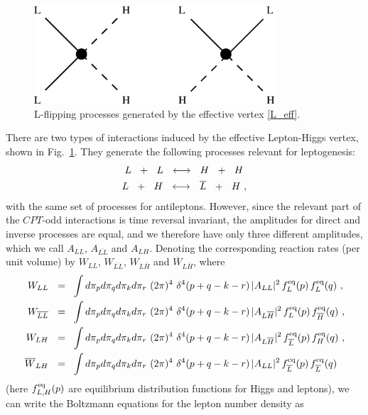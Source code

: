 \documentclass[12pt]{revtex4}
\newcommand{\eq}{{\rm eq}}
\newcommand{\ov}{\overline}
\begin{document}
\begin{figure}
\includegraphics[width=9cm]{lflip.eps}
\caption{L-flipping processes generated by the effective vertex \eqref{L_eff}.}
\label{lflip_fig}
\end{figure}
There are two types of interactions induced by the effective
Lepton-Higgs vertex, 
shown in  Fig.~\ref{lflip_fig}.
They generate the following processes relevant for leptogenesis:
\begin{align}
\notag
	L~~+~~L ~~\longleftrightarrow~~ H~~+~~H~  \\
\notag
	L~~+~~H ~~\longleftrightarrow~~ \ov{L}~~+~~H~,
\end{align}
with the same set of processes
for antileptons.
However, since the relevant part of the $CPT$-odd interactions is time reversal invariant, 
the amplitudes for
direct and inverse processes are equal, and we therefore have 
only three different amplitudes, which we call  
$ A_{LL} $, $ A_{\ov{LL}} $ and $ A_{LH} $.
Denoting the corresponding reaction rates (per unit volume) by
$ W_{LL} $, $ W_{\ov{LL}} $, $ W_{L\ov{H}} $ and $ \ov{W}_{L\ov{H}} $,
where 
\begin{align*}
	W_{LL}   ~~=~~  &
		\int d\pi_p d\pi_q d\pi_k d\pi_r ~
		(2\pi)^4~ \delta^4 ( p + q - k - r )\,
		| A_{LL} |^2\, f_L^\eq(p)\, f_L^\eq(q)~, \\
	W_{\ov{LL}}   ~~=~~  &
		\int d\pi_p d\pi_q d\pi_k d\pi_r ~
		(2\pi)^4~ \delta^4 ( p + q - k - r )\,
		| A_{L\ov{H}} |^2\, f_L^\eq(p)\, f_{\ov{H}}^\eq(q)~, \\
	W_{LH}  ~~=~~  &
		\int d\pi_p d\pi_q d\pi_k d\pi_r ~
		(2\pi)^4~ \delta^4 ( p + q - k - r )\,
		| A_{L\ov{H}} |^2\, f_{\ov{L}}^\eq(p)\, f_H^\eq(q)~, \\
	\ov{W}_{LH}  ~~=~~  &
		\int d\pi_p d\pi_q d\pi_k d\pi_r ~
		(2\pi)^4~ \delta^4 ( p + q - k - r )\,
		| A_{LL} |^2\, f_{\ov{L}}^\eq(p)\, f_{\ov{L}}^\eq(q)~
\end{align*}
	(here $ f_{L,H}^\eq(p) $ are equilibrium distribution functions for Higgs
	and leptons),
	we can write the Boltzmann equations for the lepton number density as
\end{document}
